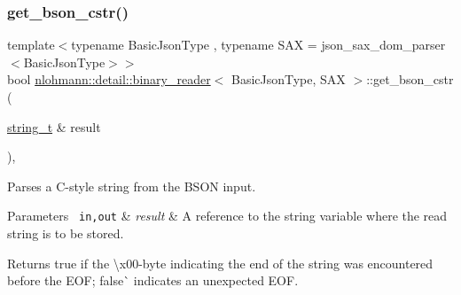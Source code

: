 \subsubsection{\texorpdfstring{get\_bson\_cstr()}{get\_bson\_cstr()}}
{\footnotesize\ttfamily template$<$typename Basic\+Json\+Type , typename S\+AX  = json\+\_\+sax\+\_\+dom\+\_\+parser$<$\+Basic\+Json\+Type$>$$>$ \\
bool \mbox{\hyperlink{classnlohmann_1_1detail_1_1binary__reader}{nlohmann\+::detail\+::binary\+\_\+reader}}$<$ Basic\+Json\+Type, S\+AX $>$\+::get\+\_\+bson\+\_\+cstr (\begin{DoxyParamCaption}\item[{\mbox{\hyperlink{classnlohmann_1_1detail_1_1binary__reader_aa0b9729917ca7ee6ed01e3792341316e}{string\+\_\+t}} \&}]{result }\end{DoxyParamCaption})\hspace{0.3cm}{\ttfamily [inline]}, {\ttfamily [private]}}



Parses a C-\/style string from the B\+S\+ON input. 


\begin{DoxyParams}[1]{Parameters}
\mbox{\texttt{ in,out}}  & {\em result} & A reference to the string variable where the read string is to be stored. \\
\hline
\end{DoxyParams}
\begin{DoxyReturn}{Returns}
{\ttfamily true} if the \textbackslash{}x00-\/byte indicating the end of the string was encountered before the E\+OF; false\`{} indicates an unexpected E\+OF. 
\end{DoxyReturn}
\mbox{\label{classnlohmann_1_1detail_1_1binary__reader_a46bf64d7193eea97cac6dd4d4abdb4fa}} 

